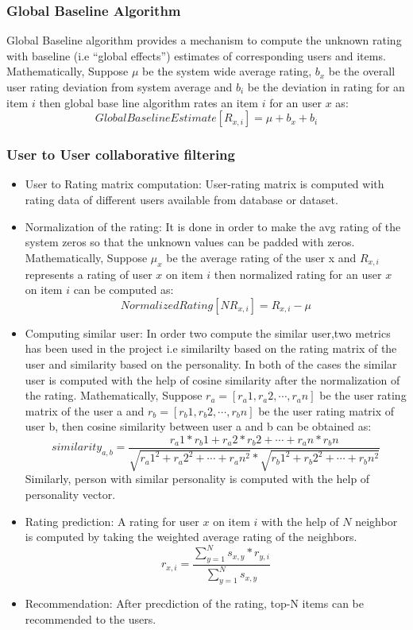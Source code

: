 \subsubsection{Global Baseline Algorithm}
Global Baseline algorithm provides a mechanism to compute the unknown rating with baseline (i.e ``global effects'') estimates of corresponding users and items.
Mathematically,
Suppose $\mu$ be the system wide average rating, $b_x$ be the overall user rating deviation from system average and $b_i$ be the deviation in rating for an item $i$ then global base line algorithm rates an item $i$ for an user $x$ as:
\begin{equation}\label{eq:baseline}
	Global Baseline Estimate[R_{x,i}] = \mu + b_x + b_i
\end{equation}
\subsubsection{User to User collaborative filtering}
\begin{itemize}
	\item User to Rating matrix computation: User-rating matrix is computed with rating data of different users available from database or dataset.
	\item Normalization of the rating: It is done in order to make the avg rating of the system zeros so that the unknown values can be padded with zeros.
Mathematically,
Suppose $\mu_x$ be the average rating of the user x and $R_{x,i}$ represents a rating of user $x$ on item $i$ then normalized rating for an user $x$ on item $i$ can be computed as:
\begin{equation}\label{eq:normal}
	Normalized Rating[NR_{x,i}] = R_{x,i} - \mu
\end{equation}
\item Computing similar user: In order two compute the similar user,two metrics has been used in the project i.e similarilty based on the rating matrix of the user and similarity based on the personality. In both of the cases the similar user is computed with the help of cosine similarity after the normalization of the rating.
Mathematically,
Suppose $r_a = [r_a1,r_a2,\cdots,r_an]$ be the user rating matrix of the user a and  $r_b = [r_b1,r_b2,\cdots,r_bn]$ be the user rating matrix of user b, then cosine similarity between user a and b can be obtained as:
\begin{equation}
	similarity_{a,b} = \frac{r_a1*r_b1 + r_a2*r_b2 +\cdots+ r_an*r_bn}{\sqrt{{r_a1}^2+{r_a2}^2+\cdots+{r_an}^2} * \sqrt{{r_b1}^2+{r_b2}^2+\cdots+{r_bn}^2} }  
\end{equation}
Similarly, person with similar personality is computed with the help of personality vector.
\item Rating prediction: A rating for user $x$ on item $i$ with the help of $N$ neighbor is computed by taking the weighted average rating of the neighbors.
\begin{equation}\label{eq:cf}
	r_{x,i} = \frac{\sum_{y=1}^N s_{x,y}*r_{y,i}}{\sum_{y=1}^N s_{x,y}}
\end{equation}
\item Recommendation: After precdiction of the rating, top-N items can be recommended to the users.
\end{itemize}
